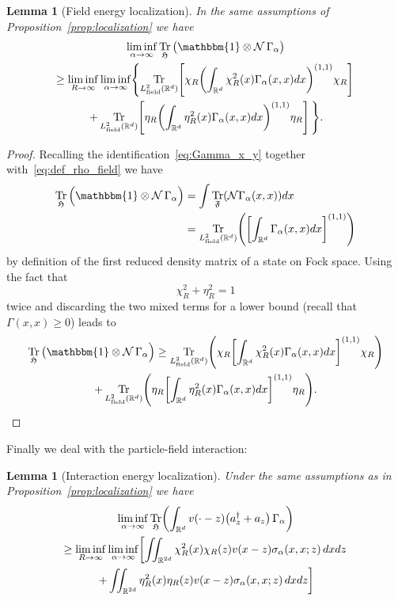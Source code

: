 \documentclass[10pt]{amsart}
\newtheorem{lemm}[theo]{Lemma}\newtheorem{prop}[theo]{Proposition}\newtheorem{coro}[theo]{Corollary}\newtheorem{conj}[theo]{Conjecture}
\theoremstyle{definition}\newtheorem{defi}[theo]{Definition}\newtheorem{rema}[theo]{Remark}\newtheorem{exam}[theo]{Example}\newtheorem{exem}[theo]{Example}\newtheorem{nota}[theo]{Notation}
\DeclareMathOperator{\Tr}{Tr}
\DeclareMathOperator{\field}{field}
\newcommand{\R}{\mathbb{R}}
\newcommand{\cN}{\mathcal{N}}
\newcommand{\gH}{\mathfrak{H}}
\newcommand{\gF}{\mathfrak{F}}
\newcommand{\1}{\mathds{1}}
\renewcommand*{\to}{\mathchoice{\longrightarrow}{\rightarrow}{\rightarrow}{\rightarrow}}
\let\originalleft\left
\let\originalright\right
\renewcommand{\left}{\mathopen{}\mathclose\bgroup\originalleft}
\renewcommand{\right}{\aftergroup\egroup\originalright}
\begin{document}
\begin{lemm}[{Field energy localization}]\label{lemma:field_localization}
In the same assumptions of Proposition~\ref{prop:localization} we have
\begin{multline}\label{eq:splitting_field}
\liminf_{\alpha\to\infty} \Tr_{ \gH}\big(\mathbbm{1}\otimes \cN\,\Gamma_\alpha\big)\\
\geq \liminf_{R \to\infty} \liminf_{\alpha\to\infty}
\left\{
\Tr_{L^2_{\field}(\R^d)}\left[\chi_R\left(\int_{\R^d} \chi_R^2(x) \Gamma_\alpha(x,x) dx\right)^{(1,1)}\chi_R\right]\right.\\
\left.+\Tr_{L^2_{\field}(\R^d)}\left[\eta_R\left(\int_{\R^d} \eta_R^2(x) \Gamma_\alpha(x,x) dx\right)^{(1,1)}\eta_R\right]\,
\right\}.
\end{multline}
\end{lemm}

\begin{proof}
Recalling the identification~\eqref{eq:Gamma_x_y} together with~\eqref{eq:def_rho_field} we have
\begin{align*}
\Tr_{ \gH}\Big(\mathbbm{1}\otimes \cN\,\Gamma_\alpha\Big)&= \int \Tr_{\gF} \left(\cN \Gamma_\alpha (x,x)\right) dx\\
&= \Tr_{L^2_{\field}(\R^d)}\left(\left[\int_{\R^d} \Gamma_\alpha(x,x)dx\right]^{(1,1)}\right)
\end{align*}
by definition of the first reduced density matrix of a state on Fock space. Using the fact that
\[
\chi_R^2+\eta_R^2=1
\]
twice and discarding the two mixed terms for a lower bound (recall that $\Gamma(x,x)\ge0$) leads to
\begin{multline*}
\Tr_{ \gH}\big(\mathbbm{1}\otimes \cN\,\Gamma_\alpha\Big) \ge \Tr_{L^2_{\field}(\R^d)}\left(\chi_R \left[\int_{\R^d}\chi_R^2(x) \Gamma_\alpha(x,x)dx\right]^{(1,1)}\chi_R\right)\\
+\Tr_{L^2_{\field}(\R^d)}\left(\eta_R \left[\int_{\R^d}\eta_R^2(x) \Gamma_\alpha(x,x)dx\right]^{(1,1)}\eta_R\right).\qedhere
\end{multline*}
\end{proof}

Finally we deal with the particle-field interaction:

\begin{lemm}[{Interaction energy localization}]\label{lemma:interaction_localization}
Under the same assumptions as in Proposition~\ref{prop:localization} we have
\begin{multline}\label{eq:splitting_interaction}
\liminf_{\alpha\to\infty} \Tr_{ \gH}\left(\int_{\R^d}v(\cdot-z) \left(a^\dagger_z + a_z\right) \,\Gamma_\alpha\right)\\
\ge \liminf_{R \to\infty} \liminf_{\alpha\to\infty}
\left[
\iint_{\R^{2d}} \chi_R^2(x)\chi_R(z) v(x-z) \sigma_\alpha(x,x;z)\, dxdz\right.\\
\left. +\iint_{\R^{2d}} \eta_R^2(x)\eta_R(z) v(x-z) \sigma_\alpha(x,x;z)\, dxdz
\right]
\end{multline}
\end{lemm}
\end{document}
